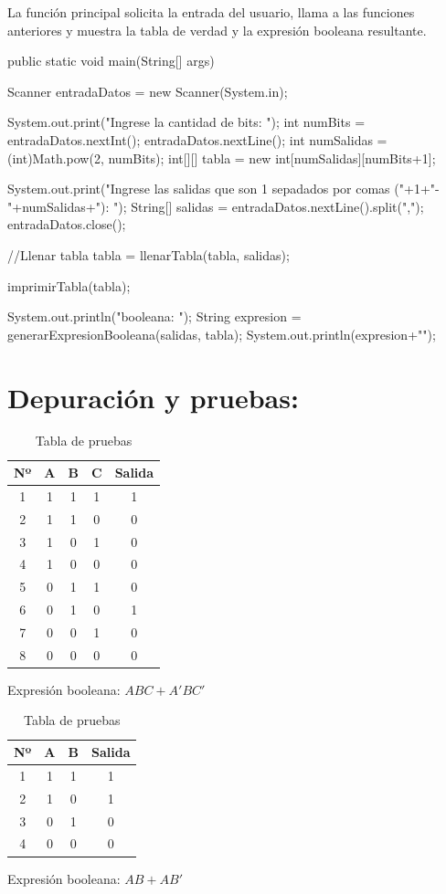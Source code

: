 \documentclass{IEEEcsmag}
\begin{document}
La función principal solicita la entrada del usuario, llama a las funciones anteriores y muestra la tabla de verdad y la expresión booleana resultante.
\begin{javaCode}
public static void main(String[] args) {
    Scanner entradaDatos = new Scanner(System.in);

    System.out.print("Ingrese la cantidad de bits: ");
    int numBits = entradaDatos.nextInt();
    entradaDatos.nextLine();
    int numSalidas = (int)Math.pow(2, numBits);
    int[][] tabla = new int[numSalidas][numBits+1];

    System.out.print("Ingrese las salidas que son 1 sepadados por comas ("+1+"-"+numSalidas+"): ");
    String[] salidas = entradaDatos.nextLine().split(",");
    entradaDatos.close();
    
    //Llenar tabla
    tabla = llenarTabla(tabla, salidas);
    
    imprimirTabla(tabla);
    
    System.out.println(" booleana: ");
    String expresion = generarExpresionBooleana(salidas, tabla);
    System.out.println(expresion+"\n");
}
\end{javaCode}

\section*{Depuración y pruebas:}

\begin{table}[h]
\centering
\begin{tabular}{|c|c|c|c|c|}
\hline
\textbf{Nº} & \textbf{A} & \textbf{B} & \textbf{C} & \textbf{Salida} \\
\hline
1 & 1 & 1 & 1 & 1 \\
2 & 1 & 1 & 0 & 0 \\
3 & 1 & 0 & 1 & 0 \\
4 & 1 & 0 & 0 & 0 \\
5 & 0 & 1 & 1 & 0 \\
6 & 0 & 1 & 0 & 1 \\
7 & 0 & 0 & 1 & 0 \\
8 & 0 & 0 & 0 & 0 \\
\hline
\end{tabular}
\caption{Tabla de pruebas}
\end{table}
Expresión booleana: $ABC + A'BC'$

\begin{table}[h]
\centering
\begin{tabular}{|c|c|c|c|}
\hline
\textbf{Nº} & \textbf{A} & \textbf{B} & \textbf{Salida} \\
\hline
1 & 1 & 1 & 1 \\
2 & 1 & 0 & 1 \\
3 & 0 & 1 & 0 \\
4 & 0 & 0 & 0 \\
\hline
\end{tabular}
\caption{Tabla de pruebas}
\end{table}
Expresión booleana: $AB + AB'$
\end{document}
